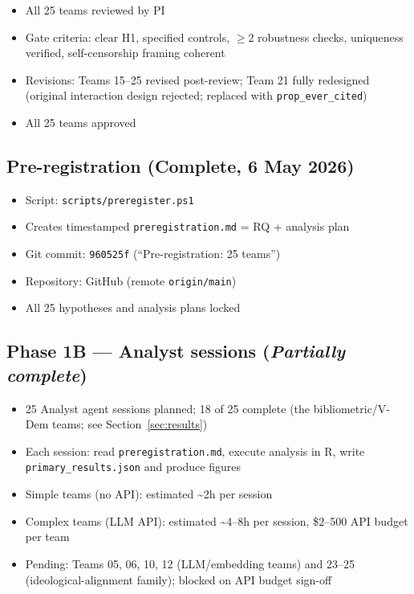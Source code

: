 \documentclass[12pt,a4paper]{article}
\begin{document}
\begin{itemize}
  \item All 25 teams reviewed by PI
  \item Gate criteria: clear H1, specified controls, $\geq 2$ robustness checks,
    uniqueness verified, self-censorship framing coherent
  \item Revisions: Teams 15--25 revised post-review; Team 21 fully redesigned
    (original interaction design rejected; replaced with \texttt{prop\_ever\_cited})
  \item All 25 teams approved
\end{itemize}

\subsection*{Pre-registration (Complete, 6 May 2026)}

\begin{itemize}
  \item Script: \texttt{scripts/preregister.ps1}
  \item Creates timestamped \texttt{preregistration.md} = RQ + analysis plan
  \item Git commit: \texttt{960525f} (``Pre-registration: 25 teams'')
  \item Repository: GitHub (remote \texttt{origin/main})
  \item All 25 hypotheses and analysis plans locked
\end{itemize}

\subsection*{Phase 1B --- Analyst sessions (\emph{Partially complete})}

\begin{itemize}
  \item 25 Analyst agent sessions planned; 18 of 25 complete (the
    bibliometric/V-Dem teams; see Section~\ref{sec:results})
  \item Each session: read \texttt{preregistration.md}, execute analysis in R,
    write \texttt{primary\_results.json} and produce figures
  \item Simple teams (no API): estimated \textasciitilde2h per session
  \item Complex teams (LLM API): estimated \textasciitilde4--8h per session,
    \$2--500 API budget per team
  \item Pending: Teams 05, 06, 10, 12 (LLM/embedding teams) and 23--25
    (ideological-alignment family); blocked on API budget sign-off
\end{itemize}
\end{document}
